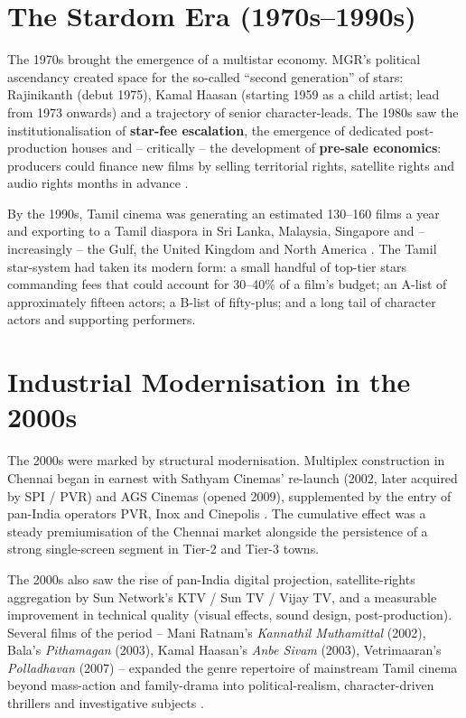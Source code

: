 \section{The Stardom Era (1970s--1990s)}
\label{sec:stardom}

The 1970s brought the emergence of a multistar economy.  MGR's
political ascendancy created space for the so-called ``second
generation'' of stars: Rajinikanth (debut 1975), Kamal Haasan
(starting 1959 as a child artist; lead from 1973 onwards) and a
trajectory of senior character-leads.  The 1980s saw the
institutionalisation of \textbf{star-fee escalation}, the
emergence of dedicated post-production houses and -- critically --
the development of \textbf{pre-sale economics}: producers could
finance new films by selling territorial rights, satellite rights
and audio rights months in advance \citep{kohlikhandekar2013,
ravindran2018}.

By the 1990s, Tamil cinema was generating an estimated 130--160
films a year and exporting to a Tamil diaspora in Sri Lanka,
Malaysia, Singapore and -- increasingly -- the Gulf, the United
Kingdom and North America \citep{baskaran2009}.  The Tamil
star-system had taken its modern form: a small handful of top-tier
stars commanding fees that could account for 30--40\% of a film's
budget; an A-list of approximately fifteen actors; a B-list of
fifty-plus; and a long tail of character actors and supporting
performers.

\section{Industrial Modernisation in the 2000s}
\label{sec:2000s}

The 2000s were marked by structural modernisation.  Multiplex
construction in Chennai began in earnest with Sathyam Cinemas'
re-launch (2002, later acquired by SPI / PVR) and AGS Cinemas
(opened 2009), supplemented by the entry of pan-India operators
PVR, Inox and Cinepolis \citep{kohlikhandekar2013,ficciey2018}.
The cumulative effect was a steady premiumisation of the Chennai
market alongside the persistence of a strong single-screen segment
in Tier-2 and Tier-3 towns.

The 2000s also saw the rise of pan-India digital projection,
satellite-rights aggregation by Sun Network's KTV / Sun TV / Vijay
TV, and a measurable improvement in technical quality (visual
effects, sound design, post-production).  Several films of the
period -- Mani Ratnam's \emph{Kannathil Muthamittal} (2002), Bala's
\emph{Pithamagan} (2003), Kamal Haasan's \emph{Anbe Sivam} (2003),
Vetrimaaran's \emph{Polladhavan} (2007) -- expanded the genre
repertoire of mainstream Tamil cinema beyond mass-action and
family-drama into political-realism, character-driven thrillers and
investigative subjects \citep{velayutham2008,nakassis2017}.

